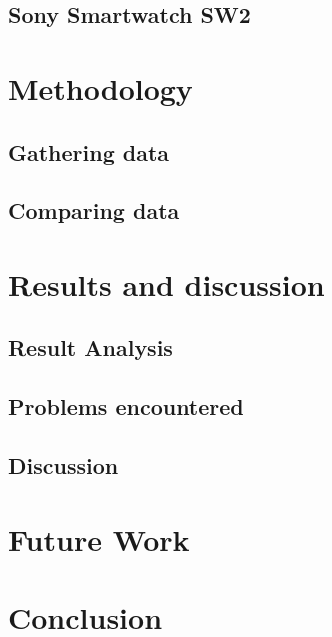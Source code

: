 \documentclass{article}
\begin{document}
	\subsection{Sony Smartwatch SW2} %
	
\newpage
\section{Methodology}		%
 
	\subsection{Gathering data} %
	
	\subsection{Comparing data}	%
	
\newpage
\section{Results and discussion}

		\subsection{Result Analysis}
		
		\subsection{Problems encountered}
		
		\subsection{Discussion}
		
\newpage
\section{Future Work}
\newpage

\section{Conclusion}

\newpage




\vspace*{2\baselineskip} %



\end{document}
